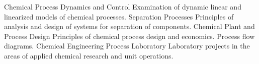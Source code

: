 \begin{cvskills}
    {Chemical Process Dynamics and Control} %
    {Examination of dynamic linear and linearized models of chemical processes.} %
\cvskill
    {Separation Processes} %
    {Principles of analysis and design of systems for separation of components.} %
\cvskill
    {Chemical Plant and Process Design} %
    {Principles of chemical process design and economics. Process flow diagrams.} %
\cvskill
    {Chemical Engineering Process Laboratory} %
    {Laboratory projects in the areas of applied chemical research and unit operations.} %
\end{cvskills}
